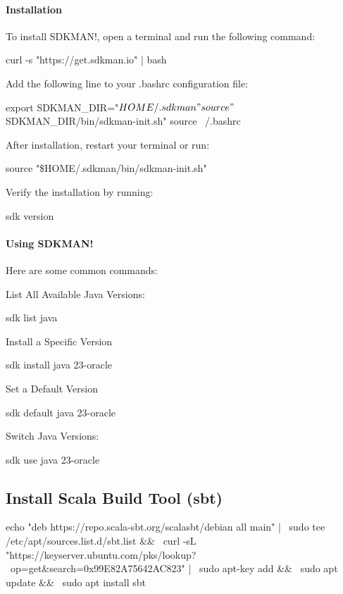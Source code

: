 \paragraph*{Installation}

To install SDKMAN!, open a terminal and run the following command:
\begin{bashcode}
     curl -s "https://get.sdkman.io" | bash       
\end{bashcode}

Add the following line to your .bashrc configuration file:
\begin{bashcode}
export SDKMAN_DIR="$HOME/.sdkman"
source "$SDKMAN_DIR/bin/sdkman-init.sh"
source ~/.bashrc
\end{bashcode}

After installation, restart your terminal or run:
\begin{bashcode}
    source "\$HOME/.sdkman/bin/sdkman-init.sh"        
\end{bashcode}

Verify the installation by running:
\begin{bashcode}
 sdk version    
\end{bashcode}       

\paragraph*{Using SDKMAN!}
Here are some common commands:

List All Available Java Versions:
\begin{bashcode}    
sdk list java
\end{bashcode}

Install a Specific Version
\begin{bashcode}
sdk install java 23-oracle   
\end{bashcode}

Set a Default Version
\begin{bashcode}
sdk default java 23-oracle    
\end{bashcode}

Switch Java Versions:
\begin{bashcode}
sdk use java 23-oracle    
\end{bashcode}

\subsection{Install Scala Build Tool (sbt)}
\begin{bashcode}
echo "deb https://repo.scala-sbt.org/scalasbt/debian all main" | \
sudo tee /etc/apt/sources.list.d/sbt.list && \
curl -sL "https://keyserver.ubuntu.com/pks/lookup? \ 
op=get&search=0x99E82A75642AC823" | \
sudo apt-key add && \
sudo apt update && \
sudo apt install sbt
\end{bashcode}


